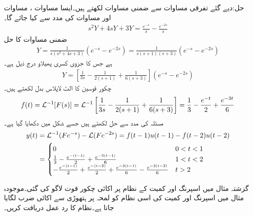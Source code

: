 حل:دیے گئے تفرقی مساوات سے ضمنی مساوات لکھتے ہیں۔ایسا مساوات ، مساوات  اور مساوات  کی مدد سے کیا جائے گا۔
\begin{align*}
s^2Y+4sY+3Y=\frac{e^{-s}}{s}-\frac{e^{-2s}}{s}
\end{align*}
ضمنی مساوات کا حل
\begin{align*}
Y=\frac{1}{s(s^2+4s+3)}(e^{-s}-e^{-2s})=\frac{1}{s(s+1)(s+3)}(e^{-s}-e^{-2s})
\end{align*}
ہے جس کا جزوی کسری پھیلاو درج ذیل ہے۔
\begin{align*}
Y=\left[\frac{1}{3s}-\frac{1}{2(s+1)}+\frac{1}{6(s+3)}\right](e^{-s}-e^{-2s})
\end{align*} 
چکور قوسین کا الٹ لاپلاس بدل لکھتے ہیں۔
\begin{align*}
f(t)=\mathcal{L}^{-1} [F(s)]=\mathcal{L}^{-1}\left[\frac{1}{3s}-\frac{1}{2(s+1)}+\frac{1}{6(s+3)}\right]=\frac{1}{3}-\frac{e^{-t}}{2}+\frac{e^{-3t}}{6}
\end{align*}
مسئلہ  کی مدد سے حل   لکھتے ہیں جسے شکل  میں دکھایا گیا ہے۔
\begin{align*}
y(t)&=\mathcal{L}^{-1}(Fe^{-s})-\mathcal{L}(Fe^{-2s})=f(t-1)u(t-1)-f(t-2)u(t-2)\\
&=
\begin{cases}
0&0< t<1\\
\frac{1}{3}-\frac{e^{-(t-1)}}{2}+\frac{e^{-3(t-1)}}{6} & 1<t<2\\
-\frac{e^{-(t-1)}}{2}+\frac{e^{-(t-2)}}{2}+\frac{e^{-3(t-1)}}{6}-\frac{e^{-3(t-2)}}{6} & t>2
\end{cases}
\end{align*}
 
گزشتہ مثال میں اسپرنگ اور کمیت کے نظام پر اکائی چکور قوت لاگو کی گئی۔موجودہ مثال میں اسپرنگ اور کمیت کی اسی نظام کو لمحہ  پر ہتھوڑی سے اکائی ضرب لگایا جاتا ہے۔نظام کا رد عمل دریافت کریں۔  

